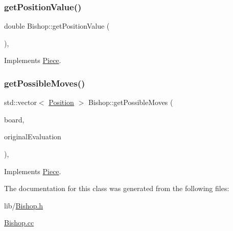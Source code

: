 \subsubsection{\texorpdfstring{get\+Position\+Value()}{getPositionValue()}}
{\footnotesize\ttfamily double Bishop\+::get\+Position\+Value (\begin{DoxyParamCaption}{ }\end{DoxyParamCaption})\hspace{0.3cm}{\ttfamily [override]}, {\ttfamily [virtual]}}



Implements \hyperlink{class_piece_a4adfa58b4f0368c9a5859afcf294e0a4}{Piece}.

\mbox{\label{class_bishop_ab2f9cc1a56bc42fc019ba6edcb4b8426}} 
\subsubsection{\texorpdfstring{get\+Possible\+Moves()}{getPossibleMoves()}}
{\footnotesize\ttfamily std\+::vector$<$ \hyperlink{struct_position}{Position} $>$ Bishop\+::get\+Possible\+Moves (\begin{DoxyParamCaption}\item[{std\+::shared\+\_\+ptr$<$ \hyperlink{class_base_board}{Base\+Board} $>$}]{board,  }\item[{bool}]{original\+Evaluation }\end{DoxyParamCaption})\hspace{0.3cm}{\ttfamily [override]}, {\ttfamily [virtual]}}



Implements \hyperlink{class_piece_a8891924c280568529878549f59541925}{Piece}.



The documentation for this class was generated from the following files\+:\begin{DoxyCompactItemize}
\item 
lib/\hyperlink{_bishop_8h}{Bishop.\+h}\item 
\hyperlink{_bishop_8cc}{Bishop.\+cc}\end{DoxyCompactItemize}
